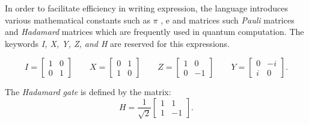 In order to facilitate efficiency in writing expression, the language introduces various mathematical constants such as $\pi$ , $\mathrm{e}$ and matrices such  \emph{Pauli} matrices and \emph{Hadamard} matrices which are frequently used in quantum computation. The keywords \emph{I, X, Y, Z, and  H} are reserved for this expressions.

\[
I =
\begin{bmatrix}
 1 & 0  \\
 0 & 1  
\end{bmatrix}
\qquad
X =
\begin{bmatrix}
 0 & 1  \\
 1 & 0  
\end{bmatrix}
\qquad
Z =
\begin{bmatrix}
 1 & 0  \\
 0 & -1  
\end{bmatrix}
\qquad
Y =
\begin{bmatrix}
 0 & -i  \\
 i & 0  
\end{bmatrix}.
\]

The \emph{Hadamard gate} is defined by the matrix:
\[
H= \frac{1}{\sqrt{2}}\begin{bmatrix}
 1 & 1  \\
 1 & -1
\end{bmatrix}.
\]